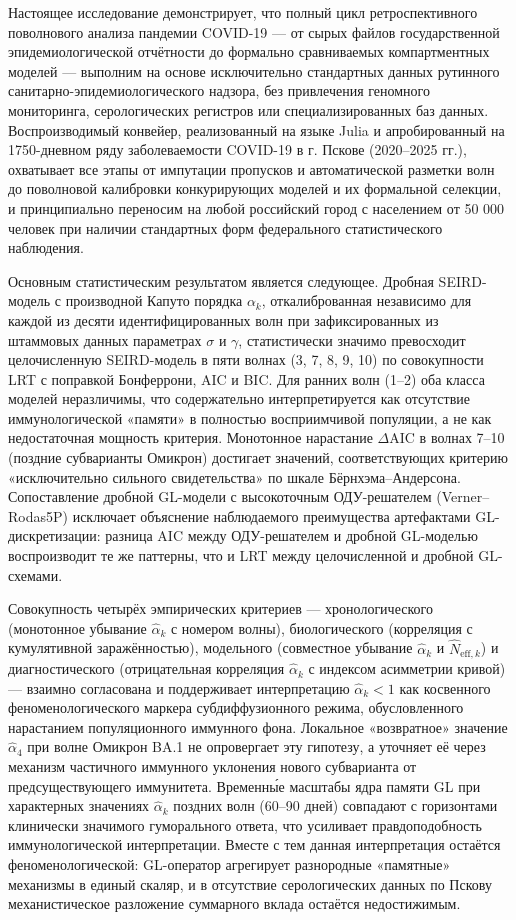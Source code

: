 \documentclass[12pt]{article}
\begin{document}
Настоящее исследование демонстрирует, что полный цикл ретроспективного
поволнового анализа пандемии COVID-19 --- от сырых файлов
государственной эпидемиологической отчётности до формально сравниваемых
компартментных моделей --- выполним на основе исключительно стандартных
данных рутинного санитарно-эпидемиологического надзора, без привлечения
геномного мониторинга, серологических регистров или специализированных
баз данных. Воспроизводимый конвейер, реализованный на языке Julia и
апробированный на 1750-дневном ряду заболеваемости COVID-19 в г. Пскове
(2020--2025 гг.), охватывает все этапы от импутации пропусков и
автоматической разметки волн до поволновой калибровки конкурирующих
моделей и их формальной селекции, и принципиально переносим на любой
российский город с населением от 50 000 человек при наличии стандартных
форм федерального статистического наблюдения.

Основным статистическим результатом является следующее. Дробная
SEIRD-модель с производной Капуто порядка \(\alpha_k\), откалиброванная
независимо для каждой из десяти идентифицированных волн при
зафиксированных из штаммовых данных параметрах \(\sigma\) и \(\gamma\),
статистически значимо превосходит целочисленную SEIRD-модель в пяти
волнах (3, 7, 8, 9, 10) по совокупности LRT с поправкой Бонферрони, AIC
и BIC. Для ранних волн (1--2) оба класса моделей неразличимы, что
содержательно интерпретируется как отсутствие иммунологической «памяти»
в полностью восприимчивой популяции, а не как недостаточная мощность
критерия. Монотонное нарастание \(\Delta\text{AIC}\) в волнах 7--10
(поздние субварианты Омикрон) достигает значений, соответствующих
критерию «исключительно сильного свидетельства» по шкале
Бёрнхэма--Андерсона. Сопоставление дробной GL-модели с высокоточным
ОДУ-решателем (Verner--Rodas5P) исключает объяснение наблюдаемого
преимущества артефактами GL-дискретизации: разница AIC между
ОДУ-решателем и дробной GL-моделью воспроизводит те же паттерны, что и
LRT между целочисленной и дробной GL-схемами.

Совокупность четырёх эмпирических критериев --- хронологического
(монотонное убывание \(\hat{\alpha}_k\) с номером волны), биологического
(корреляция с кумулятивной заражённостью), модельного (совместное
убывание \(\hat{\alpha}_k\) и \(\hat{N}_{\text{eff},k}\)) и
диагностического (отрицательная корреляция \(\hat{\alpha}_k\) с индексом
асимметрии кривой) --- взаимно согласована и поддерживает интерпретацию
\(\hat{\alpha}_k < 1\) как косвенного феноменологического маркера
субдиффузионного режима, обусловленного нарастанием популяционного
иммунного фона. Локальное «возвратное» значение \(\hat{\alpha}_4\) при
волне Омикрон BA.1 не опровергает эту гипотезу, а уточняет её через
механизм частичного иммунного уклонения нового субварианта от
предсуществующего иммунитета. Временны́е масштабы ядра памяти GL при
характерных значениях \(\hat{\alpha}_k\) поздних волн (60--90 дней)
совпадают с горизонтами клинически значимого гуморального ответа, что
усиливает правдоподобность иммунологической интерпретации. Вместе с тем
данная интерпретация остаётся феноменологической: GL-оператор агрегирует
разнородные «памятные» механизмы в единый скаляр, и в отсутствие
серологических данных по Пскову механистическое разложение суммарного
вклада остаётся недостижимым.
\end{document}
